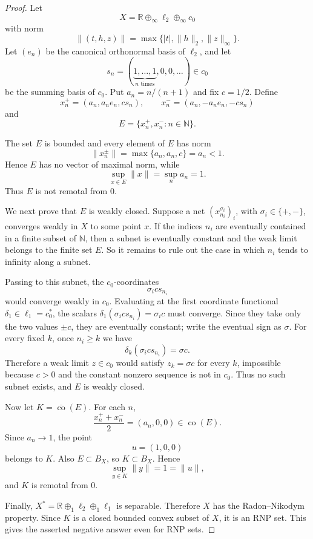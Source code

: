\documentclass[11pt]{article}
\newcommand{\R}{\mathbb{R}}
\newcommand{\N}{\mathbb{N}}
\newcommand{\clco}{\overline{\operatorname{co}}}
\begin{document}
\begin{proof}
Let
\[
  X=\R\oplus_\infty \ell_2\oplus_\infty c_0
\]
with norm
\[
  \|(t,h,z)\|=\max\{|t|,\|h\|_2,\|z\|_\infty\}.
\]
Let \((e_n)\) be the canonical orthonormal basis of \(\ell_2\), and let
\[
  s_n=(\underbrace{1,\ldots,1}_{n\text{ times}},0,0,\ldots)\in c_0
\]
be the summing basis of \(c_0\).  Put \(a_n=n/(n+1)\) and fix \(c=1/2\).  Define
\[
  x_n^+=(a_n,a_ne_n,cs_n),\qquad
  x_n^-=(a_n,-a_ne_n,-cs_n)
\]
and
\[
  E=\{x_n^+,x_n^-:n\in\N\}.
\]

The set \(E\) is bounded and every element of \(E\) has norm
\[
  \|x_n^\pm\|=\max\{a_n,a_n,c\}=a_n<1.
\]
Hence \(E\) has no vector of maximal norm, while
\[
  \sup_{x\in E}\|x\|=\sup_n a_n=1.
\]
Thus \(E\) is not remotal from \(0\).

We next prove that \(E\) is weakly closed.  Suppose a net
\((x_{n_i}^{\sigma_i})_i\), with \(\sigma_i\in\{+,-\}\), converges weakly in
\(X\) to some point \(x\).  If the indices \(n_i\) are eventually contained in
a finite subset of \(\N\), then a subnet is eventually constant and the weak
limit belongs to the finite set \(E\).  So it remains to rule out the case in
which \(n_i\) tends to infinity along a subnet.

Passing to this subnet, the \(c_0\)-coordinates
\[
  \sigma_i c s_{n_i}
\]
would converge weakly in \(c_0\).  Evaluating at the first coordinate
functional \(\delta_1\in \ell_1=c_0^*\), the scalars
\(\delta_1(\sigma_i c s_{n_i})=\sigma_i c\) must converge.  Since they take
only the two values \(\pm c\), they are eventually constant; write the eventual
sign as \(\sigma\).  For every fixed \(k\), once \(n_i\geq k\) we have
\[
  \delta_k(\sigma_i c s_{n_i})=\sigma c.
\]
Therefore a weak limit \(z\in c_0\) would satisfy \(z_k=\sigma c\) for every
\(k\), impossible because \(c>0\) and the constant nonzero sequence is not in
\(c_0\).  Thus no such subnet exists, and \(E\) is weakly closed.

Now let \(K=\clco(E)\).  For each \(n\),
\[
  \frac{x_n^++x_n^-}{2}=(a_n,0,0)\in \operatorname{co}(E).
\]
Since \(a_n\to 1\), the point
\[
  u=(1,0,0)
\]
belongs to \(K\).  Also \(E\subset B_X\), so \(K\subset B_X\).  Hence
\[
  \sup_{y\in K}\|y\|=1=\|u\|,
\]
and \(K\) is remotal from \(0\).

Finally, \(X^*=\R\oplus_1\ell_2\oplus_1\ell_1\) is separable.  Therefore \(X\)
has the Radon--Nikodym property.  Since \(K\) is a closed bounded convex subset
of \(X\), it is an RNP set.  This gives the asserted negative answer even for
RNP sets.
\end{proof}
\end{document}
